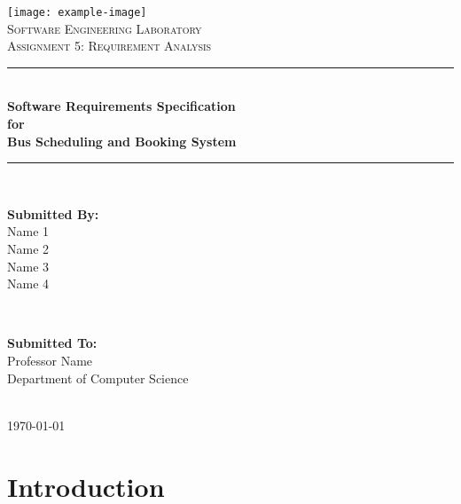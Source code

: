 \documentclass[12pt,a4paper]{report}
\begin{document}
\begin{titlepage}
    \centering
    \vspace*{1cm}
    \texttt{[image: example-image]}\\[1cm]
    
    \textsc{\LARGE Software Engineering Laboratory}\\[0.5cm]
    \textsc{\Large Assignment 5: Requirement Analysis}\\[0.5cm]
    
    \rule{\linewidth}{0.2mm}\\[0.4cm]
    {\huge\bfseries Software Requirements Specification\\[0.4cm] 
    for\\[0.4cm]
    Bus Scheduling and Booking System}\\[0.4cm]
    \rule{\linewidth}{0.2mm}\\[1.5cm]
    
    \begin{minipage}{0.4\textwidth}
        \begin{flushleft}
            \large
            \textbf{Submitted By:}\\
            Name 1\\
            Name 2\\
            Name 3\\
            Name 4\\
        \end{flushleft}
    \end{minipage}
    ~
    \begin{minipage}{0.4\textwidth}
        \begin{flushright}
            \large
            \textbf{Submitted To:}\\
            Professor Name\\
            Department of Computer Science\\
        \end{flushright}
    \end{minipage}\\[2cm]
    
    {\large \today}
    
    \vfill
\end{titlepage}

\tableofcontents

\chapter{Introduction}
\end{document}
